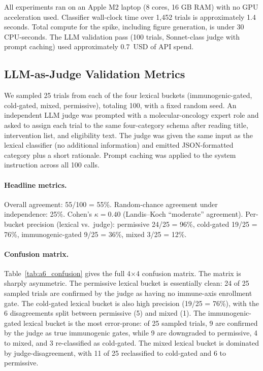 \documentclass{article}
\begin{document}
All experiments ran on an Apple M2 laptop (8 cores, 16 GB RAM) with
no GPU acceleration used.  Classifier wall-clock time over 1{,}452
trials is approximately 1.4 seconds.  Total compute for the spike,
including figure generation, is under 30 CPU-seconds.  The LLM
validation pass (100 trials, Sonnet-class judge with prompt caching)
used approximately 0.7~USD of API spend.

\subsection{LLM-as-Judge Validation Metrics}
\label{sec:a6}

We sampled 25 trials from each of the four lexical buckets
(immunogenic-gated, cold-gated, mixed, permissive), totaling 100,
with a fixed random seed.  An independent LLM judge was prompted
with a molecular-oncology expert role and asked to assign each
trial to the same four-category schema after reading title,
intervention list, and eligibility text.  The judge was given the
same input as the lexical classifier (no additional information)
and emitted JSON-formatted category plus a short rationale.  Prompt
caching was applied to the system instruction across all 100 calls.

\paragraph{Headline metrics.}
Overall agreement: 55/100 = 55\%.  Random-chance agreement under
independence: 25\%.  Cohen's $\kappa = 0.40$ (Landis--Koch
``moderate'' agreement).  Per-bucket precision (lexical vs.\ judge):
permissive 24/25 = 96\%, cold-gated 19/25 = 76\%, immunogenic-gated
9/25 = 36\%, mixed 3/25 = 12\%.

\paragraph{Confusion matrix.}
Table~\ref{tab:a6_confusion} gives the full 4$\times$4 confusion
matrix.  The matrix is sharply asymmetric.  The permissive lexical
bucket is essentially clean: 24 of 25 sampled trials are confirmed
by the judge as having no immune-axis enrollment gate.  The
cold-gated lexical bucket is also high precision (19/25 = 76\%), with
the 6 disagreements split between permissive (5) and mixed (1).
The immunogenic-gated lexical bucket is the most error-prone: of 25
sampled trials, 9 are confirmed by the judge as true immunogenic
gates, while 9 are downgraded to permissive, 4 to mixed, and 3
re-classified as cold-gated.  The mixed lexical bucket is dominated
by judge-disagreement, with 11 of 25 reclassified to cold-gated and
6 to permissive.
\end{document}
